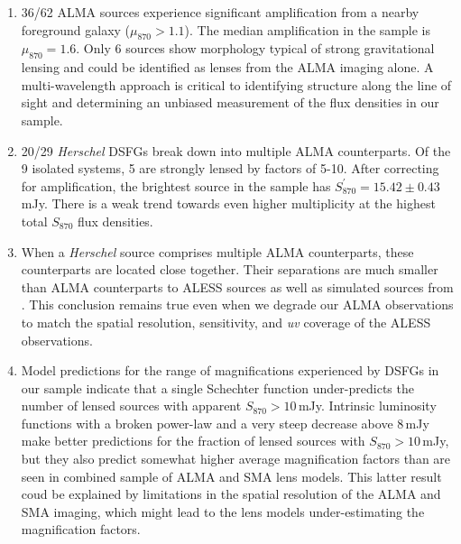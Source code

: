 \documentclass[iop]{emulateapj}
\begin{document}
\begin{enumerate}

    \item 36/62 ALMA sources experience significant amplification from a nearby
        foreground galaxy ($\mu_{870} > 1.1$).  The median amplification in the
        sample is $\mu_{870} = 1.6$.  Only 6 sources show morphology typical of
        strong gravitational lensing and could be identified as lenses from the
        ALMA imaging alone.  A multi-wavelength approach is critical to
        identifying structure along the line of sight and determining an
        unbiased measurement of the flux densities in our sample.

    \item 20/29 {\it Herschel} DSFGs break down into multiple ALMA
        counterparts.  Of the 9 isolated systems, 5 are strongly lensed by
        factors of 5-10.  After correcting for amplification, the brightest
        source in the sample has $S_{870}^\prime = 15.42 \pm 0.43\,$mJy.  There
        is a weak trend towards even higher multiplicity at the highest total
        $S_{870}$ flux densities.

    \item When a {\it Herschel} source comprises multiple ALMA counterparts,
        these counterparts are located close together.  Their separations are
        much smaller than ALMA counterparts to ALESS sources as well as
        simulated sources from \citet{HB13}.  This conclusion remains true even
        when we degrade our ALMA observations to match the spatial resolution,
        sensitivity, and {\it uv} coverage of the ALESS observations.

    \item Model predictions for the range of magnifications experienced by
        DSFGs in our sample indicate that a single Schechter function
        under-predicts the number of lensed sources with apparent $S_{870} >
        10\,$mJy.  Intrinsic luminosity functions with a broken power-law and a
        very steep decrease above 8$\,$mJy make better predictions for the
        fraction of lensed sources with $S_{870} > 10\,$mJy, but they also
        predict somewhat higher average magnification factors than are seen in
        combined sample of ALMA and SMA lens models.  This latter result coud
        be explained by limitations in the spatial resolution of the ALMA and
        SMA imaging, which might lead to the lens models under-estimating the
        magnification factors.  

\end{enumerate}
\end{document}
